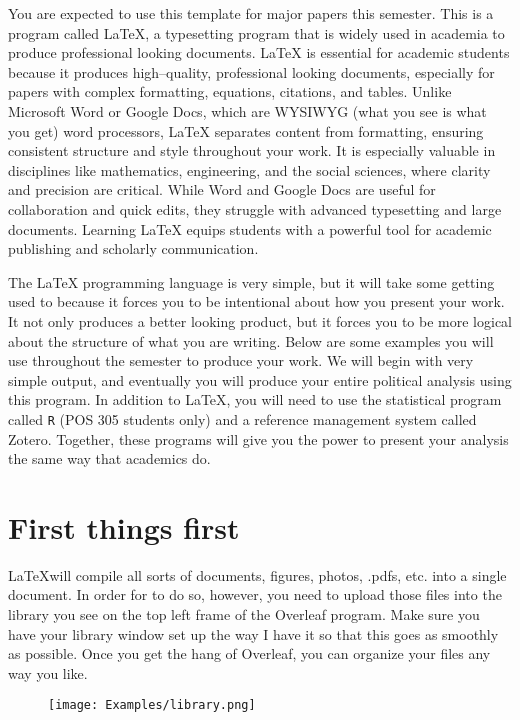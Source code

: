 \documentclass[10pt]{article}
\newcommand{\R}{\texttt{R}}
\begin{document}
 You are expected to use this template for major papers this semester. This is a program called \LaTeX, a typesetting program that is widely used in academia to produce professional looking documents. \LaTeX{} is essential for academic students because it produces high--quality, professional looking documents, especially for papers with complex formatting, equations, citations, and tables. Unlike Microsoft Word or Google Docs, which are WYSIWYG (what you see is what you get) word processors, \LaTeX{} separates content from formatting, ensuring consistent structure and style throughout your work. It is especially valuable in disciplines like mathematics, engineering, and the social sciences, where clarity and precision are critical. While Word and Google Docs are useful for collaboration and quick edits, they struggle with advanced typesetting and large documents. Learning LaTeX equips students with a powerful tool for academic publishing and scholarly communication. 

The \LaTeX{} programming language is very simple, but it will take some getting used to because it forces you to be intentional about how you present your work. It not only produces a better looking product, but it forces you to be more logical about the structure of what you are writing. Below are some examples you will use throughout the semester to produce your work. We will begin with very simple output, and eventually you will produce your entire political analysis using this program. In addition to \LaTeX{}, you will need to use the statistical program called \R{} (POS 305 students only) and a reference management system called Zotero. Together, these programs will give you the power to present your analysis the same way that academics do. 

\newpage %
\section*{First things first}
\LaTeX will compile all sorts of documents, figures, photos, .pdfs, etc. into a single document. In order for to do so, however, you need to upload those files into the library you see on the top left frame of the Overleaf program. Make sure you have your library window set up the way I have it so that this goes as smoothly as possible. Once you get the hang of Overleaf, you can organize your files any way you like.  

\begin{figure} [H] %
    \centering %
    \texttt{[image: Examples/library.png]} %
\end{figure}
\end{document}
